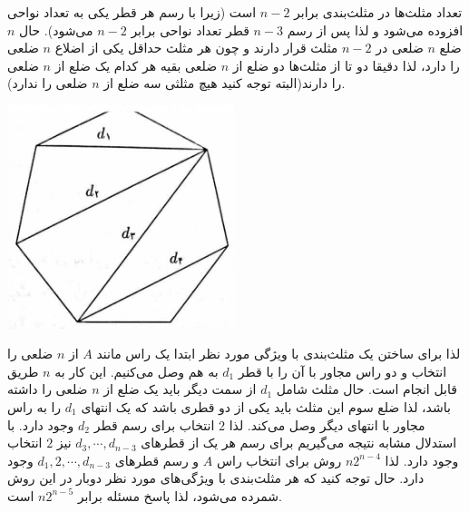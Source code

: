 \p
تعداد مثلث‌ها در مثلث‌بندی برابر
$n - 2$
است (‌زیرا با رسم هر قطر یکی به تعداد نواحی افزوده می‌شود و لذا پس از رسم
$n - 3$
قطر تعداد نواحی برابر
$n - 2$
می‌شود). حال
$n$ 
ضلع
$n$
ضلعی در
$n - 2$
مثلث قرار دارند و چون هر مثلث حداقل یکی از اضلاع
$n$
ضلعی را دارد، لذا دقیقا دو تا از مثلث‌ها دو ضلع از
$n$
ضلعی  بقیه هر کدام یک ضلع از
$n$
ضلعی را دارند(البته توجه کنید هیچ مثلثی سه ضلع از
$n$
ضلعی را ندارد).
\begin{center}
\includegraphics[height=6.5cm]{1.png}
\end{center}
لذا برای ساختن یک مثلث‌بندی با ویژگی‌ مورد نظر ابتدا یک راس مانند
$A$
از
$n$
ضلعی را انتخاب و دو راس مجاور با آن را با قطر
$d_1$
به هم وصل می‌کنیم. این کار به
$n$
طریق قابل انجام است. حال مثلث شامل
$d_1$
از سمت دیگر باید یک ضلع از
$n$
ضلعی را داشته باشد، لذا ضلع سوم این مثلث باید یکی از دو قطری باشد که یک انتهای
$d_1$
را به راس مجاور با انتهای دیگر وصل می‌کند. لذا
$2$
انتخاب برای رسم قطر 
$d_2$
وجود دارد. با استدلال مشابه نتیجه می‌گیریم برای رسم هر یک از قطرهای
$d_3, \cdots, d_{n-3}$
نیز
$2$
انتخاب وجود دارد. لذا
$n2^{n-4}$
روش برای انتخاب راس
$A$
و رسم قطرهای
$d_1, 2, \cdots, d_{n-3}$
وجود دارد. حال توجه کنید که هر مثلث‌بندی با ویژگی‌های مورد نظر دوبار در این روش شمرده می‌شود، لذا پاسخ مسئله برابر
$n2^{n-5}$
است.